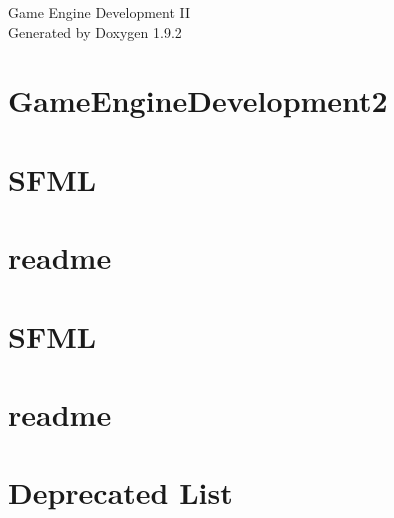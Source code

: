 \documentclass[twoside]{book}
\newcommand{\+}{\discretionary{\mbox{\scriptsize$\hookleftarrow$}}{}{}}
\newcommand{\clearemptydoublepage}{%
    \newpage{\pagestyle{empty}\cleardoublepage}%
  }
\begin{document}
  \raggedbottom
    \hypersetup{pageanchor=false,
                bookmarksnumbered=true,
                pdfencoding=unicode
               }
  \begin{titlepage}
  \vspace*{7cm}
  \begin{center}%
  {\Large Game Engine Development II}\\
  \vspace*{1cm}
  {\large Generated by Doxygen 1.9.2}\\
  \end{center}
  \end{titlepage}
  \clearemptydoublepage
  \tableofcontents
  \clearemptydoublepage
  \hypersetup{pageanchor=true}
\chapter{Game\+Engine\+Development2}
\label{md__r_e_a_d_m_e}

\chapter{SFML}
\label{md__s_f_m_l_2_5_1_license}

\chapter{readme}
\label{md__s_f_m_l_2_5_1_readme}

\chapter{SFML}
\label{md__week14__s_f_m_l_2_5_1_license}

\chapter{readme}
\label{md__week14__s_f_m_l_2_5_1_readme}

\chapter{Deprecated List}
\label{deprecated}

\end{document}
